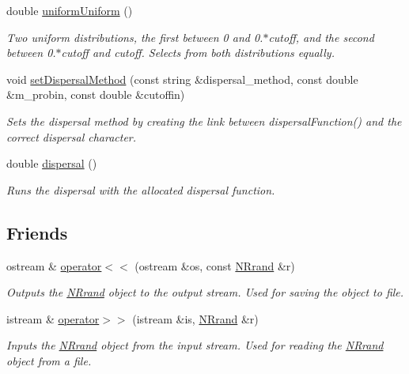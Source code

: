 \begin{DoxyCompactItemize}
double \hyperlink{class_n_rrand_a799f55c57dc238f094a20e882e3abb51}{uniform\+Uniform} ()
\begin{DoxyCompactList}\small\item\em Two uniform distributions, the first between 0 and 0.$\ast$cutoff, and the second between 0.$\ast$cutoff and cutoff. Selects from both distributions equally. \end{DoxyCompactList}\item 
void \hyperlink{class_n_rrand_a432b648073ccd3cb7f8215bb5c299619}{set\+Dispersal\+Method} (const string \&dispersal\+\_\+method, const double \&m\+\_\+probin, const double \&cutoffin)
\begin{DoxyCompactList}\small\item\em Sets the dispersal method by creating the link between dispersal\+Function() and the correct dispersal character. \end{DoxyCompactList}\item 
double \hyperlink{class_n_rrand_a1e15746ff8398488245b750325f37b08}{dispersal} ()
\begin{DoxyCompactList}\small\item\em Runs the dispersal with the allocated dispersal function. \end{DoxyCompactList}\end{DoxyCompactItemize}
\subsection*{Friends}
\begin{DoxyCompactItemize}
\item 
ostream \& \hyperlink{class_n_rrand_a604ebc1c878ab63df21e123dbd34185f}{operator$<$$<$} (ostream \&os, const \hyperlink{class_n_rrand}{N\+Rrand} \&r)
\begin{DoxyCompactList}\small\item\em Outputs the \hyperlink{class_n_rrand}{N\+Rrand} object to the output stream. Used for saving the object to file. \end{DoxyCompactList}\item 
istream \& \hyperlink{class_n_rrand_a0b8544414e90bb92ba90afa881b1f06e}{operator$>$$>$} (istream \&is, \hyperlink{class_n_rrand}{N\+Rrand} \&r)
\begin{DoxyCompactList}\small\item\em Inputs the \hyperlink{class_n_rrand}{N\+Rrand} object from the input stream. Used for reading the \hyperlink{class_n_rrand}{N\+Rrand} object from a file. \end{DoxyCompactList}\end{DoxyCompactItemize}



